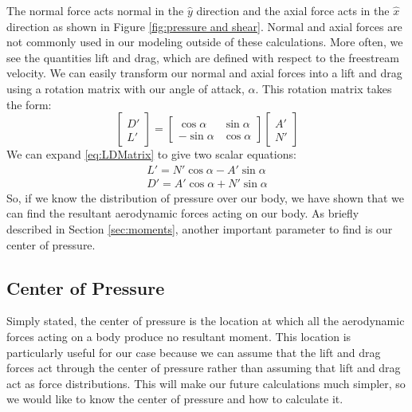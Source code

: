 \documentclass[12pt]{report}
\begin{document}
{The normal force acts normal in the $\hat{y}$ direction and the axial force acts in the $\hat {x}$ direction as shown in Figure \ref{fig:pressure and shear}. Normal and axial forces are not commonly used in our modeling outside of these calculations. More often, we see the quantities lift and drag, which are defined with respect to the \gls{freestream} velocity. We can easily transform our normal and axial forces into a lift and drag using a rotation matrix with our \gls{angle of attack}, $\alpha$. This rotation matrix takes the form:
\begin{equation}\label{eq:LDMatrix}
 \begin{bmatrix}
     D'\\L'
 \end{bmatrix}
 =\begin{bmatrix}
        \cos\alpha &\sin\alpha\\
        -\sin\alpha&\cos\alpha
    \end{bmatrix}
    \begin{bmatrix}
        A'\\N'
    \end{bmatrix}
\end{equation}
We can expand \eqref{eq:LDMatrix} to give two scalar equations:
\begin{gather}
        L'=N'\cos\alpha-A'\sin\alpha\\
        D'=A'\cos\alpha+N'\sin\alpha
\end{gather}
So, if we know the distribution of pressure over our body, we have shown that we can find the resultant aerodynamic forces acting on our body. As briefly described in Section \ref{sec:moments}, another important parameter to find is our center of pressure.
\subsection{Center of Pressure}
Simply stated, the center of pressure is the location at which all the aerodynamic forces acting on a body produce no resultant moment. This location is particularly useful for our case because we can assume that the lift and drag forces act through the center of pressure rather than assuming that lift and drag act as force distributions. This will make our future calculations much simpler, so we would like to know the center of pressure and how to calculate it.

}
\end{document}

